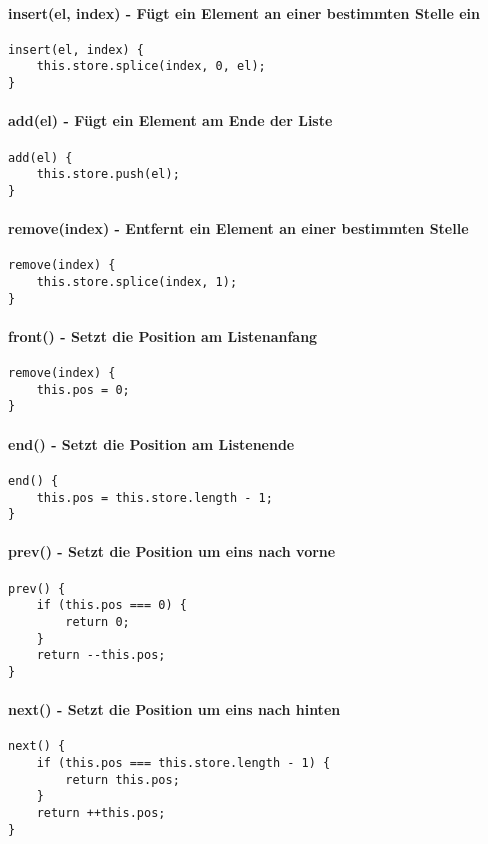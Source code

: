 \documentclass{book}
\begin{document}
\paragraph{insert(el, index) - Fügt ein Element an einer bestimmten Stelle ein} 
\begin{lstlisting}[caption=Array Konstruktor]
insert(el, index) {
	this.store.splice(index, 0, el);
}
\end{lstlisting}

\paragraph{add(el) - Fügt ein Element am Ende der Liste}
\begin{lstlisting}[caption=Array Konstruktor]
add(el) {
	this.store.push(el);
}
\end{lstlisting}
\paragraph{remove(index) - Entfernt ein Element an einer bestimmten Stelle}
\begin{lstlisting}[caption=Array Konstruktor]
remove(index) {
	this.store.splice(index, 1);
}
\end{lstlisting}
\paragraph{front() - Setzt die Position am Listenanfang}
\begin{lstlisting}[caption=Array Konstruktor]
remove(index) {
	this.pos = 0;
}
\end{lstlisting}
\paragraph{end() - Setzt die Position am Listenende}
\begin{lstlisting}[caption=Array Konstruktor]
end() {
	this.pos = this.store.length - 1;
}
\end{lstlisting}

\paragraph{prev() - Setzt die Position um eins nach vorne}
\begin{lstlisting}[caption=Array Konstruktor]
prev() {
	if (this.pos === 0) {
		return 0;
	}
	return --this.pos;
}
\end{lstlisting}
\paragraph{next() - Setzt die Position um eins nach hinten}
\begin{lstlisting}[caption=Array Konstruktor]
next() {
	if (this.pos === this.store.length - 1) {
		return this.pos;
	}
	return ++this.pos;
}
\end{lstlisting}
\end{document}
